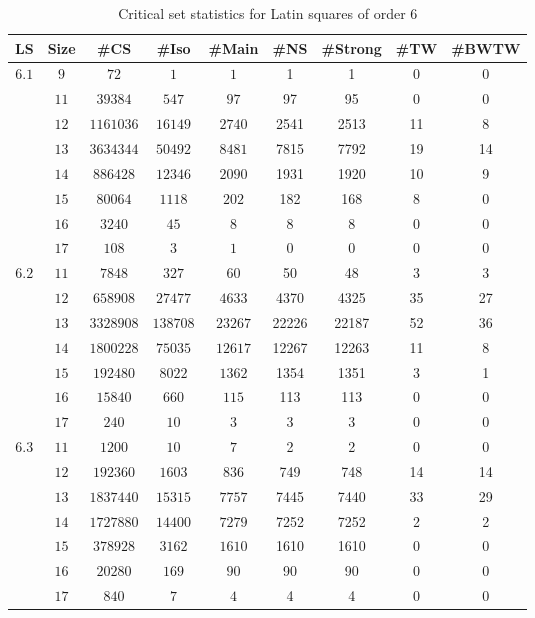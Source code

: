 \begin{table}
\begin{center}
\caption{Critical set statistics for Latin squares of order 6}
\label{four}
\begin{tabular}{|c|c|c|c|c|c|c|c|c|} \hline
 LS & Size & \#CS & \#Iso & \#Main& \#NS & \#Strong & \#TW & \#BWTW \\ \hline
$6.1$ & $9$  & $72$    & $1$    & $1$ & 1 & 1 & 0 & 0 \\
      & $11$  & $39384$ & $547$  & $97$ & 97 & 95 & 0 & 0  \\
      & $12$  & $1161036$ & $16149$  & $2740$ & 2541 & 2513 & 11 & 8 \\
      & $13$  & $3634344$ & $50492$  & $8481$ & 7815 & 7792 & 19 & 14 \\
      & $14$  & $886428$ & $12346$  & $2090$ & 1931 & 1920 & 10 & 9 \\
      & $15$  & $80064$ & $1118$  & $202$ & 182 & 168 & 8 & 0 \\
      & $16$  & $3240$ & $45$  & $8$ & 8 & 8 & 0 & 0 \\
      & $17$  & $108$  & $3$   & $1$ & 0 & 0 & 0 & 0 \\ \hline
$6.2$ & $11$  & $7848$ & $327$  & $60$ & 50 & 48 & 3 & 3 \\
      & $12$  & $658908$ & $27477$  & $4633$ & 4370 & 4325 & 35 & 27 \\
      & $13$  & $3328908$ & $138708$  & $23267$ & 22226 & 22187 & 52 & 36 \\
      & $14$  & $1800228$ & $75035$  & $12617$ & 12267 & 12263 & 11 & 8 \\
      & $15$  & $192480$ & $8022$  & $1362$ & 1354 & 1351 & 3 & 1 \\
      & $16$  & $15840$ & $660$  & $115$ & 113 & 113 & 0 & 0 \\
      & $17$  & $240$  & $10$   & $3$ & 3 & 3 & 0 & 0  \\ \hline
$6.3$ & $11$  & $1200$ & $10$  & $7$ & 2 & 2 & 0 & 0 \\
      & $12$  & $192360$ & $1603$  & $836$ & 749 & 748 & 14 & 14 \\
      & $13$  & $1837440$ & $15315$  & $7757$ & 7445 & 7440 & 33 & 29 \\
      & $14$  & $1727880$ & $14400$  & $7279$ & 7252 & 7252 & 2 & 2 \\
      & $15$  & $378928$ & $3162$  & $1610$ & 1610 & 1610 & 0 & 0 \\
      & $16$  & $20280$ & $169$  & $90$ & 90 & 90 & 0 & 0 \\
      & $17$  & $840$  & $7$   & $4$ & 4 & 4 & 0 & 0 \\ \hline
\end{tabular}\vspace {3mm} \\
\end{center}
\end{table}
